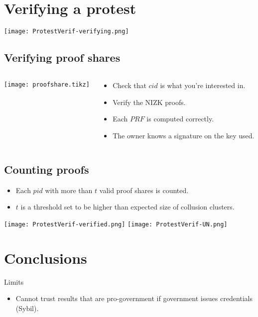 \section[Verifying]{Verifying a protest}

\begin{frame}
  \centering
  \texttt{[image: ProtestVerif-verifying.png]}
\end{frame}

\subsection{Verifying proof shares}

\begin{frame}
  \begin{columns}
    \begin{column}{0.5\linewidth}
      \tiny
      \texttt{[image: proofshare.tikz]}
    \end{column}

    \begin{column}{0.5\linewidth}
      \begin{itemize}
        \item Check that \(cid\) is what you're interested in.
        \item Verify the \ac{NIZK} proofs.
        \item Each \(PRF\) is computed correctly.
        \item The owner knows a signature on the key used.
      \end{itemize}
    \end{column}
  \end{columns}
\end{frame}

\subsection{Counting proofs}

\begin{frame}
  \begin{itemize}
    \item Each \(pid\) with more than \(t\) valid proof shares is counted.
    \item \(t\) is a threshold set to be higher than expected size of collusion 
      clusters.
  \end{itemize}
\end{frame}

\begin{frame}
  \centering
  \texttt{[image: ProtestVerif-verified.png]}
  \texttt{[image: ProtestVerif-UN.png]}
\end{frame}


\section{Conclusions}

\begin{frame}
  \begin{alertblock}{Limits}
    \begin{itemize}
      \item Cannot trust results that are pro-government if government issues 
        credentials (Sybil).
    \end{itemize}
  \end{alertblock}
\end{frame}
